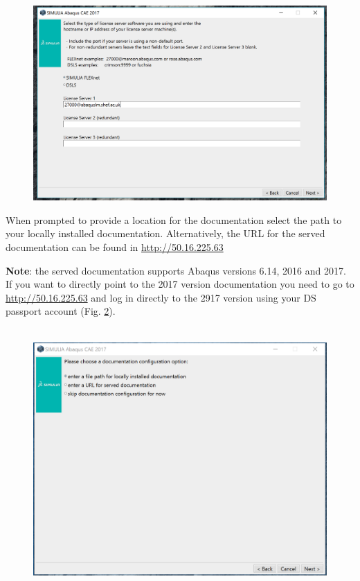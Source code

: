\documentclass[10pt,a4paper,oneside]{article}
\begin{document}
\begin{enumerate}
\begin{figure}[ht]
\centering
	\includegraphics[width=14 cm, height=10 cm]{abaqus_license.png} 
	\caption{}
	\label{fig:abaqus2}
\end{figure}

When prompted to provide a location for the documentation select the path to your locally installed documentation. Alternatively, the URL for the served documentation can be found in \url{http://50.16.225.63} 

\textbf{Note}: the served documentation supports Abaqus versions 6.14, 2016 and 2017. If you want to directly point to the 2017 version documentation you need to go to \url{http://50.16.225.63} and log in directly to the 2917 version using your DS passport account (Fig. \ref{fig:abaqus3}).

\begin{figure}[ht]
\centering
	\includegraphics[width=14cm, height=10cm]{documentation_CAE.png} 
	\caption{}
	\label{fig:abaqus3}
\end{figure}



\end{enumerate}
\end{document}
